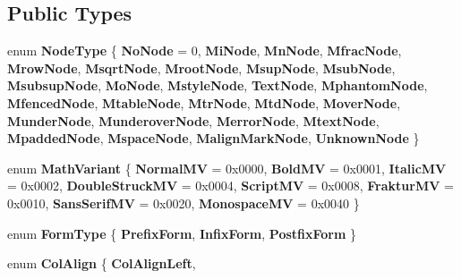 \subsection*{Public Types}
\begin{DoxyCompactItemize}
\item 
\mbox{\label{struct_mml_a75cded1e891c3b1cb1ccf0610f2a6e10}} 
enum {\bfseries Node\+Type} \{ \newline
{\bfseries No\+Node} = 0, 
{\bfseries Mi\+Node}, 
{\bfseries Mn\+Node}, 
{\bfseries Mfrac\+Node}, 
\newline
{\bfseries Mrow\+Node}, 
{\bfseries Msqrt\+Node}, 
{\bfseries Mroot\+Node}, 
{\bfseries Msup\+Node}, 
\newline
{\bfseries Msub\+Node}, 
{\bfseries Msubsup\+Node}, 
{\bfseries Mo\+Node}, 
{\bfseries Mstyle\+Node}, 
\newline
{\bfseries Text\+Node}, 
{\bfseries Mphantom\+Node}, 
{\bfseries Mfenced\+Node}, 
{\bfseries Mtable\+Node}, 
\newline
{\bfseries Mtr\+Node}, 
{\bfseries Mtd\+Node}, 
{\bfseries Mover\+Node}, 
{\bfseries Munder\+Node}, 
\newline
{\bfseries Munderover\+Node}, 
{\bfseries Merror\+Node}, 
{\bfseries Mtext\+Node}, 
{\bfseries Mpadded\+Node}, 
\newline
{\bfseries Mspace\+Node}, 
{\bfseries Malign\+Mark\+Node}, 
{\bfseries Unknown\+Node}
 \}
\item 
\mbox{\label{struct_mml_ae280136f6c621514c149e7119164f7dc}} 
enum {\bfseries Math\+Variant} \{ \newline
{\bfseries Normal\+MV} = 0x0000, 
{\bfseries Bold\+MV} = 0x0001, 
{\bfseries Italic\+MV} = 0x0002, 
{\bfseries Double\+Struck\+MV} = 0x0004, 
\newline
{\bfseries Script\+MV} = 0x0008, 
{\bfseries Fraktur\+MV} = 0x0010, 
{\bfseries Sans\+Serif\+MV} = 0x0020, 
{\bfseries Monospace\+MV} = 0x0040
 \}
\item 
\mbox{\label{struct_mml_af540e04894f930288801058cb7a33e10}} 
enum {\bfseries Form\+Type} \{ {\bfseries Prefix\+Form}, 
{\bfseries Infix\+Form}, 
{\bfseries Postfix\+Form}
 \}
\item 
\mbox{\label{struct_mml_a0855254e31af67543f989f698c307f58}} 
enum {\bfseries Col\+Align} \{ {\bfseries Col\+Align\+Left}, 

\end{DoxyCompactItemize}
